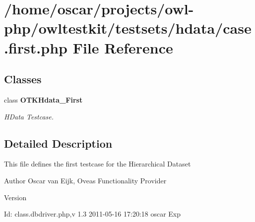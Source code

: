 \section{/home/oscar/projects/owl-\/php/owltestkit/testsets/hdata/case.first.php File Reference}
\label{case_8first_8php}
\subsection*{Classes}
\begin{DoxyCompactItemize}
\item 
class {\bf OTKHdata\_\-First}
\begin{DoxyCompactList}\small\item\em HData Testcase. \end{DoxyCompactList}\end{DoxyCompactItemize}


\subsection{Detailed Description}
This file defines the first testcase for the Hierarchical Dataset \begin{DoxyAuthor}{Author}
Oscar van Eijk, Oveas Functionality Provider 
\end{DoxyAuthor}
\begin{DoxyVersion}{Version}

\end{DoxyVersion}
\begin{DoxyParagraph}{Id:}
class.dbdriver.php,v 1.3 2011-\/05-\/16 17:20:18 oscar Exp 
\end{DoxyParagraph}
